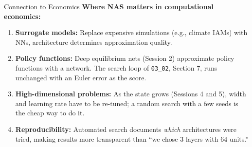 \documentclass[aspectratio=169,11pt]{beamer}
\begin{document}
\begin{frame}{Connection to Economics}
\textbf{Where NAS matters in computational economics:}

\vspace{0.3cm}
\begin{enumerate}
    \item \textbf{Surrogate models:} Replace expensive simulations (e.g., climate IAMs) with NNs, architecture determines approximation quality.

    \vspace{0.2cm}
    \item \textbf{Policy functions:} Deep equilibrium nets (Session 2) approximate policy functions with a network. The search loop of \texttt{03\_02}, Section 7, runs unchanged with an Euler error as the score.

    \vspace{0.2cm}
    \item \textbf{High-dimensional problems:} As the state grows (Sessions 4 and 5), width and learning rate have to be re-tuned; a random search with a few seeds is the cheap way to do it.

    \vspace{0.2cm}
    \item \textbf{Reproducibility:} Automated search documents \emph{which} architectures were tried, making results more transparent than ``we chose 3 layers with 64 units.''
\end{enumerate}
\end{frame}
\end{document}
